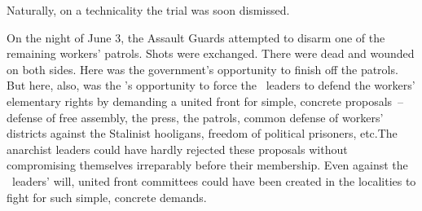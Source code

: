 Naturally, on a technicality the trial was soon dismissed.

\medskip

On the night of June 3, the Assault Guards attempted to disarm one of the remaining workers’ patrols. Shots were exchanged. There were dead and wounded on both sides. Here was the government’s opportunity to finish off the patrols. But here, also, was the \POUM’s opportunity to force the \CNT\ leaders to defend the workers’ elementary rights by demanding a united front for simple, concrete proposals~-- defense of free assembly, the press, the patrols, common defense of workers’ districts against the Stalinist hooligans, freedom of political prisoners, etc.\@ The anarchist leaders could have hardly rejected these proposals without compromising themselves irreparably before their membership. Even against the \CNT\ leaders’ will, united front committees could have been created in the localities to fight for such simple, concrete demands.

